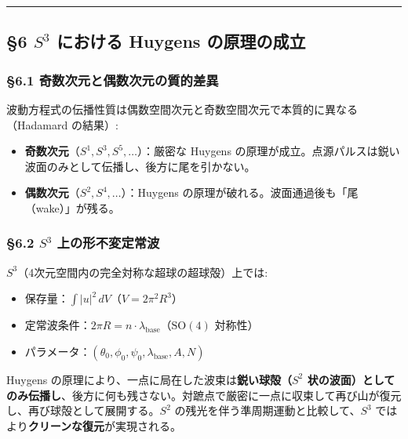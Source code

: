 \documentclass[
  a4paper,11pt]{ltjsarticle}
\providecommand{\tightlist}{%
  \setlength{\itemsep}{0pt}\setlength{\parskip}{0pt}}
\theoremstyle{definition}
\theoremstyle{remark}
\begin{document}
\begin{center}\rule{0.5\linewidth}{0.5pt}\end{center}

\subsection{\texorpdfstring{§6 \(S^3\) における Huygens
の原理の成立}{§6 S\^{}3 における Huygens の原理の成立}}\label{s3-ux306bux304aux3051ux308b-huygens-ux306eux539fux7406ux306eux6210ux7acb}

\subsubsection{§6.1
奇数次元と偶数次元の質的差異}\label{ux5947ux6570ux6b21ux5143ux3068ux5076ux6570ux6b21ux5143ux306eux8ceaux7684ux5deeux7570}

波動方程式の伝播性質は偶数空間次元と奇数空間次元で本質的に異なる（Hadamard
の結果）:

\begin{itemize}
\tightlist
\item
  \textbf{奇数次元}（\(S^1, S^3, S^5, \ldots\)）：厳密な Huygens
  の原理が成立。点源パルスは鋭い波面のみとして伝播し、後方に尾を引かない。
\item
  \textbf{偶数次元}（\(S^2, S^4, \ldots\)）：Huygens
  の原理が破れる。波面通過後も「尾（wake）」が残る。
\end{itemize}

\subsubsection{\texorpdfstring{§6.2 \(S^3\)
上の形不変定常波}{§6.2 S\^{}3 上の形不変定常波}}\label{s3-ux4e0aux306eux5f62ux4e0dux5909ux5b9aux5e38ux6ce2}

\(S^3\)（4次元空間内の完全対称な超球の超球殻）上では:

\begin{itemize}
\tightlist
\item
  保存量：\(\int |u|^2 \, dV\)（\(V = 2\pi^2 R^3\)）
\item
  定常波条件：\(2\pi R = n \cdot \lambda_{\text{base}}\)（\(\mathrm{SO}(4)\)
  対称性）
\item
  パラメータ：\((\theta_0, \phi_0, \psi_0, \lambda_{\text{base}}, A, N)\)
\end{itemize}

Huygens の原理により、一点に局在した波束は\textbf{鋭い球殻（\(S^2\)
状の波面）としてのみ伝播し}、後方に何も残さない。対蹠点で厳密に一点に収束して再び山が復元し、再び球殻として展開する。\(S^2\)
の残光を伴う準周期運動と比較して、\(S^3\)
ではより\textbf{クリーンな復元}が実現される。
\end{document}
